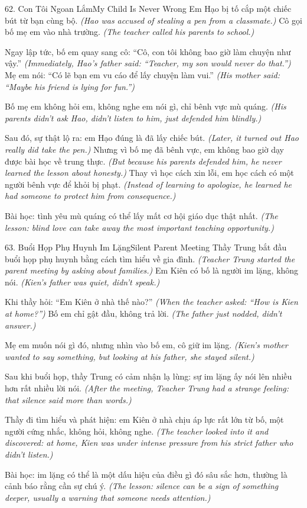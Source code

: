 \begin{truyen}{62. Con Tôi Ngoan Lắm}{My Child Is Never Wrong}
Em Hạo bị tố cắp một chiếc bút từ bạn cùng bộ.
\textit{(Hao was accused of stealing a pen from a classmate.)}
Cô gọi bố mẹ em vào nhà trường.
\textit{(The teacher called his parents to school.)}

Ngay lập tức, bố em quay sang cô: ``Cô, con tôi không bao giờ làm chuyện như vậy.''
\textit{(Immediately, Hao's father said: ``Teacher, my son would never do that.'')}
Mẹ em nói: ``Có lẽ bạn em vu cáo để lấy chuyện làm vui.''
\textit{(His mother said: ``Maybe his friend is lying for fun.'')}

Bố mẹ em không hỏi em, không nghe em nói gì, chỉ bênh vực mù quáng.
\textit{(His parents didn't ask Hao, didn't listen to him, just defended him blindly.)}

Sau đó, sự thật lộ ra: em Hạo đúng là đã lấy chiếc bút.
\textit{(Later, it turned out Hao really did take the pen.)}
Nhưng vì bố mẹ đã bênh vực, em không bao giờ dạy được bài học về trung thực.
\textit{(But because his parents defended him, he never learned the lesson about honesty.)}
Thay vì học cách xin lỗi, em học cách có một người bênh vực để khỏi bị phạt.
\textit{(Instead of learning to apologize, he learned he had someone to protect him from consequence.)}

Bài học: tình yêu mù quáng có thể lấy mất cơ hội giáo dục thật nhất.
\textit{(The lesson: blind love can take away the most important teaching opportunity.)}
\end{truyen}

\begin{truyen}{63. Buổi Họp Phụ Huynh Im Lặng}{Silent Parent Meeting}
Thầy Trung bắt đầu buổi họp phụ huynh bằng cách tìm hiểu về gia đình.
\textit{(Teacher Trung started the parent meeting by asking about families.)}
Em Kiên có bố là người im lặng, không nói.
\textit{(Kien's father was quiet, didn't speak.)}

Khi thầy hỏi: ``Em Kiên ở nhà thế nào?''
\textit{(When the teacher asked: ``How is Kien at home?'')}
Bố em chỉ gật đầu, không trả lời.
\textit{(The father just nodded, didn't answer.)}

Mẹ em muốn nói gì đó, nhưng nhìn vào bố em, cô giữ im lặng.
\textit{(Kien's mother wanted to say something, but looking at his father, she stayed silent.)}

Sau khi buổi họp, thầy Trung có cảm nhận lạ lùng: sự im lặng ấy nói lên nhiều hơn rất nhiều lời nói.
\textit{(After the meeting, Teacher Trung had a strange feeling: that silence said more than words.)}

Thầy đi tìm hiểu và phát hiện: em Kiên ở nhà chịu áp lực rất lớn từ bố, một người cứng nhắc, không hỏi, không nghe.
\textit{(The teacher looked into it and discovered: at home, Kien was under intense pressure from his strict father who didn't listen.)}

Bài học: im lặng có thể là một dấu hiệu của điều gì đó sâu sắc hơn, thường là cảnh báo rằng cần sự chú ý.
\textit{(The lesson: silence can be a sign of something deeper, usually a warning that someone needs attention.)}
\end{truyen}

